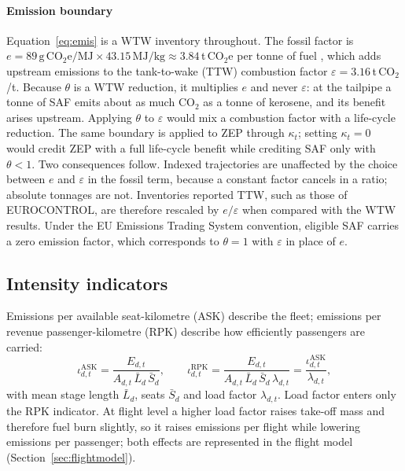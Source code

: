 \documentclass[preprint, 12pt, authoryear]{elsarticle}
\begin{document}
\paragraph{Emission boundary} Equation~\eqref{eq:emis} is a WTW inventory
throughout. The fossil factor is $e = 89\,\mathrm{g\,CO_2e/MJ} \times
43.15\,\mathrm{MJ/kg} \approx 3.84$\,t\,CO$_2$e per tonne of fuel
\citep{icaocorsia}, which adds upstream emissions to the tank-to-wake (TTW)
combustion factor $\varepsilon=3.16$\,t\,CO$_2$/t. Because $\theta$ is a WTW
reduction, it multiplies $e$ and never $\varepsilon$: at the tailpipe a tonne of
SAF emits about as much CO$_2$ as a tonne of kerosene, and its benefit arises
upstream. Applying $\theta$ to $\varepsilon$ would mix a combustion factor with a
life-cycle reduction. The same boundary is applied to ZEP through $\kappa_t$;
setting $\kappa_t=0$ would credit ZEP with a full life-cycle benefit while
crediting SAF only with $\theta<1$. Two consequences follow. Indexed
trajectories are unaffected by the choice between $e$ and $\varepsilon$ in the
fossil term, because a constant factor cancels in a ratio; absolute tonnages are
not. Inventories reported TTW, such as those of EUROCONTROL, are therefore
rescaled by $e/\varepsilon$ when compared with the WTW results. Under the EU
Emissions Trading System convention, eligible SAF carries a zero emission
factor, which corresponds to $\theta=1$ with $\varepsilon$ in place of $e$.

\subsection{Intensity indicators}

Emissions per available seat-kilometre (ASK) describe the fleet; emissions per
revenue passenger-kilometre (RPK) describe how efficiently passengers are
carried:
\begin{equation}
\label{eq:intensity}
\iota^{\mathrm{ASK}}_{d,t} = \frac{E_{d,t}}{A_{d,t}\,\bar L_d\,\bar S_d},
\qquad
\iota^{\mathrm{RPK}}_{d,t} = \frac{E_{d,t}}{A_{d,t}\,\bar L_d\,\bar S_d\,\lambda_{d,t}}
= \frac{\iota^{\mathrm{ASK}}_{d,t}}{\lambda_{d,t}},
\end{equation}
with mean stage length $\bar L_d$, seats $\bar S_d$ and load factor
$\lambda_{d,t}$. Load factor enters only the RPK indicator. At flight level a
higher load factor raises take-off mass and therefore fuel burn slightly, so it
raises emissions per flight while lowering emissions per passenger; both
effects are represented in the flight model (Section~\ref{sec:flightmodel}).
\end{document}
